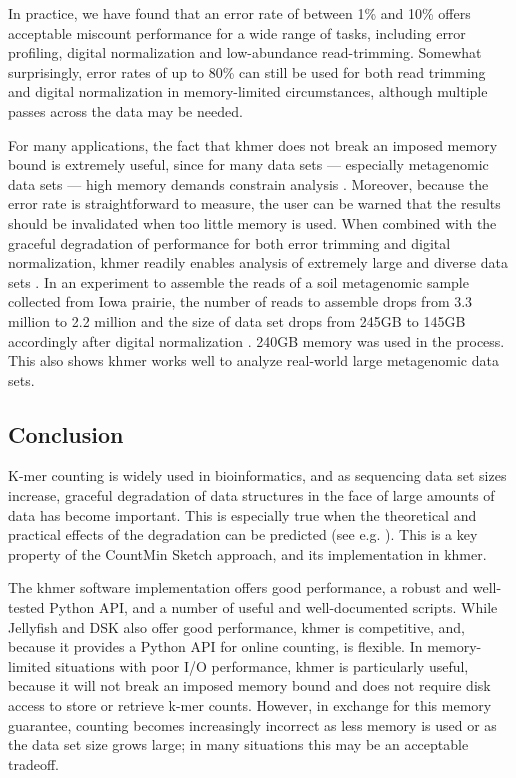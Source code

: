 \documentclass[10pt]{article}
\begin{document}
In practice, we have found that an error rate of between 1\% and 10\%
offers acceptable miscount performance for a wide range of tasks,
including error profiling, digital normalization and low-abundance
read-trimming.  Somewhat surprisingly, error rates of up to 80\% can
still be used for both read trimming and digital normalization in
memory-limited circumstances, although multiple passes across the data
may be needed.

For many applications, the fact that khmer does not break an imposed
memory bound is extremely useful, since for many data sets ---
especially metagenomic data sets --- high memory demands constrain
analysis \cite{Howe2012,Luo2009}.  Moreover, because the error rate is
straightforward to measure, the user can be warned that the results
should be invalidated when too little memory is used.  When combined
with the graceful degradation of performance for both error trimming
and digital normalization, khmer readily enables analysis of extremely
large and diverse data sets \cite{adina2013}. In an experiment to
assemble the reads of a soil metagenomic sample collected from Iowa
prairie, the number of reads to assemble drops from 3.3 million to 2.2
million and the size of data set drops from 245GB to 145GB accordingly
after digital normalization \cite{Howe2012}.  240GB memory was used in
the process. This also shows khmer works well to analyze real-world
large metagenomic data sets.

\subsection*{Conclusion}

K-mer counting is widely used in bioinformatics, and as sequencing
data set sizes increase, graceful degradation of data structures in
the face of large amounts of data has become important.  This is
especially true when the theoretical and practical effects of the
degradation can be predicted (see e.g. \cite{Melsted2011, Pell2012,
  Roy2014}).  This is a key property of the CountMin Sketch approach,
and its implementation in khmer.

The khmer software implementation offers good performance, a robust
and well-tested Python API, and a number of useful and well-documented
scripts.  While Jellyfish and DSK also offer good performance, khmer
is competitive, and, because it provides a Python API for online
counting, is flexible.  In memory-limited situations with poor I/O
performance, khmer is particularly useful, because it will not break
an imposed memory bound and does not require disk access to store or
retrieve k-mer counts.  However, in exchange for this memory
guarantee, counting becomes increasingly incorrect as less memory is
used or as the data set size grows large; in many situations this may
be an acceptable tradeoff.
\end{document}

